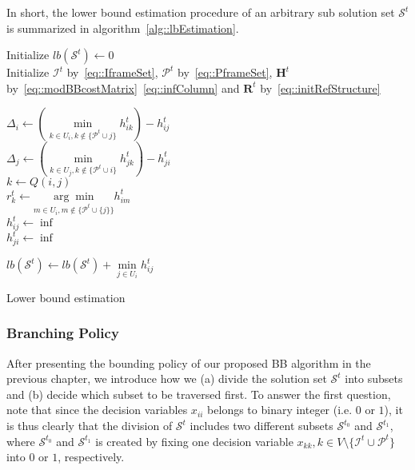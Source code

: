 %
In short, the lower bound estimation procedure of an arbitrary sub solution set $\mathcal{S}^t$ is summarized in algorithm~\ref{alg::lbEstimation}.
%
\IncMargin{1em}
\begin{algorithm}[]
 \SetAlgoLined
 \BlankLine
 Initialize $lb(\mathcal{S}^t) \gets 0$\\
 Initialize $\mathcal{I}^t$ by~\eqref{eq::IframeSet}, $\mathcal{P}^t$ by~\eqref{eq::PframeSet}, $\mathbf{H}^t$ by~\eqref{eq::modBBcostMatrix}~\eqref{eq::infColumn} and $\mathbf{R}^t$ by~\eqref{eq::initRefStructure} \\
 {
 	$\Delta_i \gets \left( \underset{k \in U_i, k \notin \{\mathcal{P}^t \cup j\}}{\min} h_{ik}^t \right) - h_{ij}^t$ \\
	$\Delta_j \gets \left( \underset{k \in U_j, k \notin \{\mathcal{P}^t \cup i\}}{\min} h_{jk}^t \right) - h_{ji}^t$ \\
 	$k \gets Q(i,j)$ \\
 	$r_k^t \gets \underset{m \in U_i, m \notin \{\mathcal{P}^t \cup \{j\}\}}{\arg \min} h_{im}^t$ \\
 	{
 		$h_{ij}^t \gets \inf$ \\
 	}
 	{
 		$h_{ji}^t \gets \inf$ \\
 	}
 	
 }
 {
 	$lb(\mathcal{S}^t) \gets lb(\mathcal{S}^t) + \underset{j \in U_i}{\min} h_{ij}^t$ \\
 }
 \caption{\label{alg::lbEstimation}Lower bound estimation}
\end{algorithm}
\DecMargin{1em}
%
\subsubsection{Branching Policy}
After presenting the bounding policy of our proposed BB algorithm in the previous chapter, we introduce how we (a) divide the solution set $\mathcal{S}^t$ into subsets and (b) decide which subset to be traversed first.
To answer the first question, note that since the decision variables $x_{ii}$ belongs to binary integer (i.e. $0$ or $1$), it is thus clearly that the division of $\mathcal{S}^t$ includes two different subsets $\mathcal{S}^{t_0}$ and $\mathcal{S}^{t_1}$, where  $\mathcal{S}^{t_0}$ and $\mathcal{S}^{t_1}$ is created by fixing one decision variable ${x_{kk},k \in V \setminus \{\mathcal{I}^t \cup \mathcal{P}^t\} }$ into $0$ or $1$, respectively.

